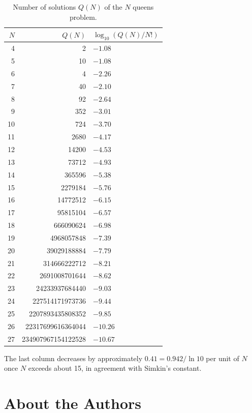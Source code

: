 \documentclass[11pt,twoside,openany]{book}
\theoremstyle{plain}
\theoremstyle{definition}
\theoremstyle{remark}
\begin{document}
\begin{table}[h]
\centering
\small
\caption{Number of solutions $Q(N)$ of the $N$ queens problem.}
\label{tab:counts}
\begin{tabular}{rrl}
\toprule
$N$ & $Q(N)$ & $\log_{10}(Q(N) / N!)$ \\
\midrule
4 & 2 & $-1.08$ \\
5 & 10 & $-1.08$ \\
6 & 4 & $-2.26$ \\
7 & 40 & $-2.10$ \\
8 & 92 & $-2.64$ \\
9 & 352 & $-3.01$ \\
10 & 724 & $-3.70$ \\
11 & 2680 & $-4.17$ \\
12 & 14200 & $-4.53$ \\
13 & 73712 & $-4.93$ \\
14 & 365596 & $-5.38$ \\
15 & 2279184 & $-5.76$ \\
16 & 14772512 & $-6.15$ \\
17 & 95815104 & $-6.57$ \\
18 & 666090624 & $-6.98$ \\
19 & 4968057848 & $-7.39$ \\
20 & 39029188884 & $-7.79$ \\
21 & 314666222712 & $-8.21$ \\
22 & 2691008701644 & $-8.62$ \\
23 & 24233937684440 & $-9.03$ \\
24 & 227514171973736 & $-9.44$ \\
25 & 2207893435808352 & $-9.85$ \\
26 & 22317699616364044 & $-10.26$ \\
27 & 234907967154122528 & $-10.67$ \\
\bottomrule
\end{tabular}
\end{table}

The last column decreases by approximately $0.41 = 0.942 / \ln 10$ per unit of $N$ once $N$ exceeds about 15, in agreement with Simkin's constant.









\backmatter

\chapter*{About the Authors}
\end{document}
